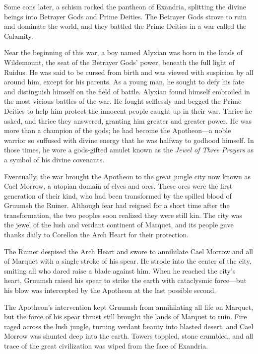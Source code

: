 \documentclass[a4paper, 11pt, bg=full, twocolumn, nooutline]{dndbook}
\begin{document}
Some eons later, a schism rocked the pantheon of Exandria, splitting the divine beings into Betrayer Gods and Prime Deities. The Betrayer Gods strove to ruin and dominate the world, and they battled the Prime Deities in a war called the Calamity.

Near the beginning of this war, a boy named Alyxian was born in the lands of Wildemount, the seat of the Betrayer Gods' power, beneath the full light of Ruidus. He was said to be cursed from birth and was viewed with suspicion by all around him, except for his parents. As a young man, he sought to defy his fate and distinguish himself on the field of battle. Alyxian found himself embroiled in the most vicious battles of the war. He fought selflessly and begged the Prime Deities to help him protect the innocent people caught up in their war. Thrice he asked, and thrice they answered, granting him greater and greater power. He was more than a champion of the gods; he had become the Apotheon---a noble warrior so suffused with divine energy that he was halfway to godhood himself. In those times, he wore a gods-gifted amulet known as the \textit{Jewel of Three Prayers} as a symbol of his divine covenants.

Eventually, the war brought the Apotheon to the great jungle city now known as Cael Morrow, a utopian domain of elves and orcs. These orcs were the first generation of their kind, who had been transformed by the spilled blood of Gruumsh the Ruiner. Although fear had reigned for a short time after the transformation, the two peoples soon realized they were still kin. The city was the jewel of the lush and verdant continent of Marquet, and its people gave thanks daily to Corellon the Arch Heart for their protection.

The Ruiner despised the Arch Heart and swore to annihilate Cael Morrow and all of Marquet with a single stroke of his spear. He strode into the center of the city, smiting all who dared raise a blade against him. When he reached the city's heart, Gruumsh raised his spear to strike the earth with cataclysmic force---but his blow was intercepted by the Apotheon at the last possible second.

The Apotheon's intervention kept Gruumsh from annihilating all life on Marquet, but the force of his spear thrust still brought the lands of Marquet to ruin. Fire raged across the lush jungle, turning verdant beauty into blasted desert, and Cael Morrow was shunted deep into the earth. Towers toppled, stone crumbled, and all trace of the great civilization was wiped from the face of Exandria.
\end{document}
